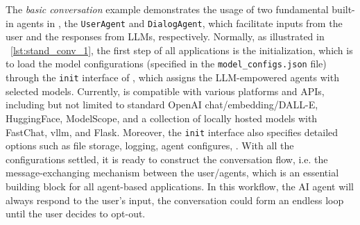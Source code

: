 The \textit{basic conversation} example demonstrates the usage of two fundamental built-in agents in \ours, the \texttt{UserAgent} and \texttt{DialogAgent}, which facilitate inputs from the user and the responses from LLMs, respectively. Normally, as illustrated in  \lstlistingname~\ref{lst:stand_conv_1}, the first step of all applications is the initialization, which is to load the model configurations (specified in the \texttt{model\_configs.json} file) through the \texttt{init} interface of \ours, which assigns the LLM-empowered agents with selected models. Currently, \ours is compatible with various platforms and APIs, including but not limited to standard OpenAI chat/embedding/DALL-E, HuggingFace, ModelScope, and a collection of locally hosted models with FastChat, vllm, and Flask. Moreover, the \texttt{init} interface also specifies detailed options such as file storage, logging, agent configures, \etc.
With all the configurations settled, it is ready to construct the conversation flow, i.e. the message-exchanging mechanism between the user/agents, which is an essential building block for all agent-based applications. In this workflow, the AI agent will always respond to the user's input, the conversation could form an endless loop until the user decides to opt-out.

